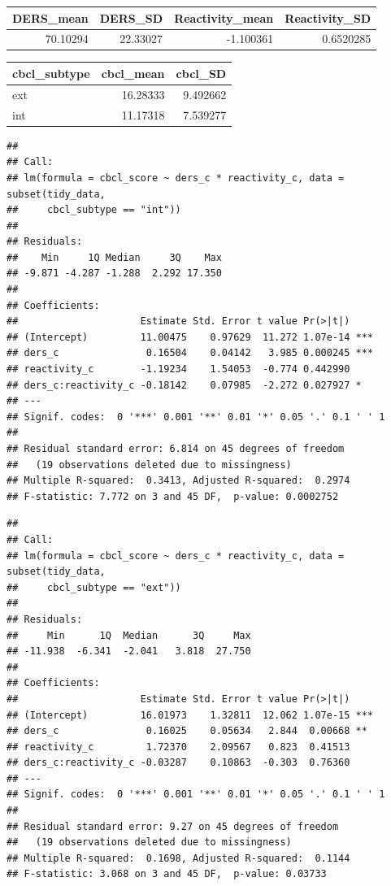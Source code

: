 \documentclass[man]{apa6}
\begin{document}
\begin{tabular}{rrrr}
\toprule
DERS\_mean & DERS\_SD & Reactivity\_mean & Reactivity\_SD\\
\midrule
70.10294 & 22.33027 & -1.100361 & 0.6520285\\
\bottomrule
\end{tabular}

\begin{tabular}{lrr}
\toprule
cbcl\_subtype & cbcl\_mean & cbcl\_SD\\
\midrule
ext & 16.28333 & 9.492662\\
int & 11.17318 & 7.539277\\
\bottomrule
\end{tabular}

\begin{verbatim}
## 
## Call:
## lm(formula = cbcl_score ~ ders_c * reactivity_c, data = subset(tidy_data, 
##     cbcl_subtype == "int"))
## 
## Residuals:
##    Min     1Q Median     3Q    Max 
## -9.871 -4.287 -1.288  2.292 17.350 
## 
## Coefficients:
##                     Estimate Std. Error t value Pr(>|t|)    
## (Intercept)         11.00475    0.97629  11.272 1.07e-14 ***
## ders_c               0.16504    0.04142   3.985 0.000245 ***
## reactivity_c        -1.19234    1.54053  -0.774 0.442990    
## ders_c:reactivity_c -0.18142    0.07985  -2.272 0.027927 *  
## ---
## Signif. codes:  0 '***' 0.001 '**' 0.01 '*' 0.05 '.' 0.1 ' ' 1
## 
## Residual standard error: 6.814 on 45 degrees of freedom
##   (19 observations deleted due to missingness)
## Multiple R-squared:  0.3413, Adjusted R-squared:  0.2974 
## F-statistic: 7.772 on 3 and 45 DF,  p-value: 0.0002752
\end{verbatim}

\begin{verbatim}
## 
## Call:
## lm(formula = cbcl_score ~ ders_c * reactivity_c, data = subset(tidy_data, 
##     cbcl_subtype == "ext"))
## 
## Residuals:
##     Min      1Q  Median      3Q     Max 
## -11.938  -6.341  -2.041   3.818  27.750 
## 
## Coefficients:
##                     Estimate Std. Error t value Pr(>|t|)    
## (Intercept)         16.01973    1.32811  12.062 1.07e-15 ***
## ders_c               0.16025    0.05634   2.844  0.00668 ** 
## reactivity_c         1.72370    2.09567   0.823  0.41513    
## ders_c:reactivity_c -0.03287    0.10863  -0.303  0.76360    
## ---
## Signif. codes:  0 '***' 0.001 '**' 0.01 '*' 0.05 '.' 0.1 ' ' 1
## 
## Residual standard error: 9.27 on 45 degrees of freedom
##   (19 observations deleted due to missingness)
## Multiple R-squared:  0.1698, Adjusted R-squared:  0.1144 
## F-statistic: 3.068 on 3 and 45 DF,  p-value: 0.03733
\end{verbatim}
\end{document}
